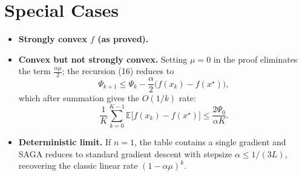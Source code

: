 \documentclass{article}
\newcommand{\E}{\mathbb{E}}
\begin{document}
\section*{Special Cases}
\begin{itemize}[leftmargin=*]
\item \textbf{Strongly convex $f$ (as proved).}
\item \textbf{Convex but not strongly convex.}  
Setting $\mu=0$ in the proof eliminates the term $\frac{\alpha\mu}{2}$; the recursion (16) reduces to
\[
\Psi_{k+1}\le\Psi_k-\frac{\alpha}{2}\bigl(f(x_k)-f(x^\star)\bigr),
\]
which after summation gives the $O(1/k)$ rate:
\[
\frac{1}{K}\sum_{k=0}^{K-1}\E\!\bigl[f(x_k)-f(x^\star)\bigr]\le\frac{2\Psi_0}{\alpha K}.
\]
\item \textbf{Deterministic limit.}  
If $n=1$, the table contains a single gradient and SAGA reduces to standard gradient descent with stepsize $\alpha\le 1/(3L)$, recovering the classic linear rate $ (1-\alpha\mu)^k$.
\end{itemize}
\end{document}
